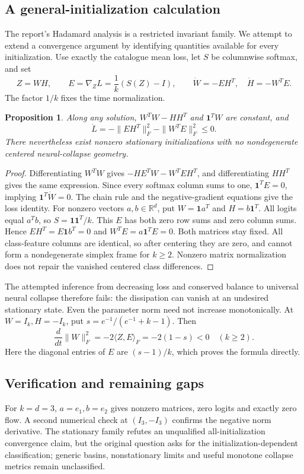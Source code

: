 \documentclass[11pt]{article}
\newtheorem{proposition}{Proposition}
\begin{document}
\subsection{A general-initialization calculation}
The report's Hadamard analysis is a restricted invariant family. We attempt to extend a convergence argument by identifying quantities available for every initialization. Use exactly the catalogue mean loss, let $S$ be columnwise softmax, and set
\[
 Z=WH,\qquad E=\nabla_Z L=\frac1k(S(Z)-I),\qquad
 \dot W=-EH^T,\quad\dot H=-W^TE.
\]
The factor $1/k$ fixes the time normalization.
\begin{proposition}
Along any solution, $W^TW-HH^T$ and $\mathbf1^TW$ are constant, and
\[
 \dot L=-\|EH^T\|_F^2-\|W^TE\|_F^2\le0.
\]
There nevertheless exist nonzero stationary initializations with no nondegenerate centered neural-collapse geometry.
\end{proposition}
\begin{proof}
Differentiating $W^TW$ gives $-HE^TW-W^TEH^T$, and differentiating $HH^T$ gives the same expression. Since every softmax column sums to one, $\mathbf1^TE=0$, implying $\mathbf1^T\dot W=0$. The chain rule and the negative-gradient equations give the loss identity.
For nonzero vectors $a,b\in\mathbb R^d$, put $W=\mathbf1a^T$ and $H=b\mathbf1^T$. All logits equal $a^Tb$, so $S=\mathbf1\mathbf1^T/k$. This $E$ has both zero row sums and zero column sums. Hence $EH^T=E\mathbf1b^T=0$ and $W^TE=a\mathbf1^TE=0$. Both matrices stay fixed. All class-feature columns are identical, so after centering they are zero, and cannot form a nondegenerate simplex frame for $k\ge2$. Nonzero matrix normalization does not repair the vanished centered class differences.
\end{proof}
The attempted inference from decreasing loss and conserved balance to universal neural collapse therefore fails: the dissipation can vanish at an undesired stationary state. Even the parameter norm need not increase monotonically. At $W=I_k,H=-I_k$, put $s=e^{-1}/(e^{-1}+k-1)$. Then
\[
 \frac{d}{dt}\|W\|_F^2=-2\langle Z,E\rangle_F=-2(1-s)<0\quad(k\ge2).
\]
Here the diagonal entries of $E$ are $(s-1)/k$, which proves the formula directly.
\subsection{Verification and remaining gaps}
For $k=d=3$, $a=e_1,b=e_2$ gives nonzero matrices, zero logits and exactly zero flow. A second numerical check at $(I_3,-I_3)$ confirms the negative norm derivative. The stationary family refutes an unqualified all-initialization convergence claim, but the original question asks for the initialization-dependent classification; generic basins, nonstationary limits and useful monotone collapse metrics remain unclassified.
\end{document}
